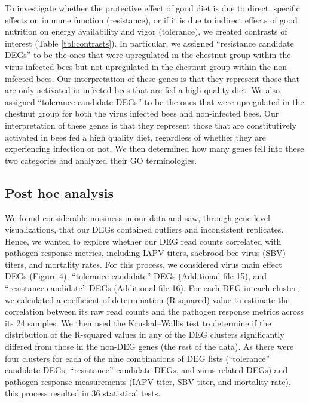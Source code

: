 \documentclass{bmcart}
\begin{document}
\begin{linenumbers}
\begin{doublespacing}
To investigate whether the protective effect of good diet is due to direct, specific effects on immune function (resistance), or if it is due to indirect effects of good nutrition on energy availability and vigor (tolerance), we created contrasts of interest (Table \ref{tbl:contrasts}). In particular, we assigned ``resistance candidate DEGs'' to be the ones that were upregulated in the chestnut group within the virus infected bees but not upregulated in the chestnut group within the non-infected bees. Our interpretation of these genes is that they represent those that are only activated in infected bees that are fed a high quality diet. We also assigned ``tolerance candidate DEGs'' to be the ones that were upregulated in the chestnut group for both the virus infected bees and non-infected bees. Our interpretation of these genes is that they represent those that are constitutively activated in bees fed a high quality diet, regardless of whether they are experiencing infection or not. We then determined how many genes fell into these two categories and analyzed their GO terminologies.

\subsection*{Post hoc analysis}

We found considerable noisiness in our data and saw, through gene-level visualizations, that our DEGs contained outliers and inconsistent replicates. Hence, we wanted to explore whether our DEG read counts correlated with pathogen response metrics, including IAPV titers, sacbrood bee virus (SBV) titers, and mortality rates. For this process, we considered virus main effect DEGs (Figure 4), ``tolerance candidate'' DEGs (Additional file 15), and ``resistance candidate'' DEGs (Additional file 16). For each DEG in each cluster, we calculated a coefficient of determination (R-squared) value to estimate the correlation between its raw read counts and the pathogen response metrics across its 24 samples. We then used the Kruskal–Wallis test to determine if the distribution of the R-squared values in any of the DEG clusters significantly differed from those in the non-DEG genes (the rest of the data). As there were four clusters for each of the nine combinations of DEG lists (``tolerance'' candidate DEGs, ``resistance'' candidate DEGs, and virus-related DEGs) and pathogen response measurements (IAPV titer, SBV titer, and mortality rate), this process resulted in 36 statistical tests.


\end{doublespacing}
\end{linenumbers}
\end{document}
